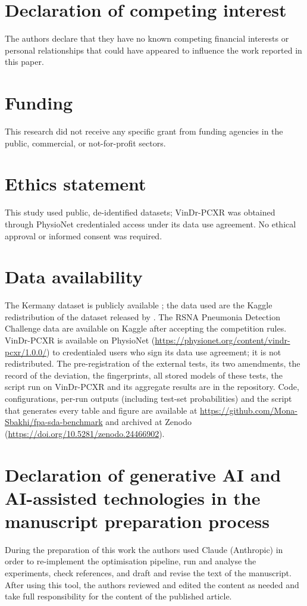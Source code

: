 \documentclass[preprint,12pt]{elsarticle}
\begin{document}
\section*{Declaration of competing interest}
The authors declare that they have no known competing financial interests or personal relationships that could have appeared to influence the work reported in this paper.

\section*{Funding}
This research did not receive any specific grant from funding agencies in the public, commercial, or not-for-profit sectors.

\section*{Ethics statement}
This study used public, de-identified datasets; VinDr-PCXR was obtained through PhysioNet credentialed access under its data use agreement. No ethical approval or informed consent was required.

\section*{Data availability}
The Kermany dataset is publicly available \citep{kaggle2018cxr,kermany2018}; the data used are the Kaggle redistribution of the dataset released by \citet{kermany2018}. The RSNA Pneumonia Detection Challenge data \citep{shih2019rsna} are available on Kaggle after accepting the competition rules. VinDr-PCXR \citep{pham2023pedicxr} is available on PhysioNet (\url{https://physionet.org/content/vindr-pcxr/1.0.0/}) to credentialed users who sign its data use agreement; it is not redistributed. The pre-registration of the external tests, its two amendments, the record of the deviation, the fingerprints, all stored models of these tests, the script run on VinDr-PCXR and its aggregate results are in the repository. Code, configurations, per-run outputs (including test-set probabilities) and the script that generates every table and figure are available at \url{https://github.com/Mona-Sbakhi/fpa-sda-benchmark} and archived at Zenodo (\url{https://doi.org/10.5281/zenodo.24466902}).

\section*{Declaration of generative AI and AI-assisted technologies in the manuscript preparation process}
During the preparation of this work the authors used Claude (Anthropic) in order to re-implement the optimisation pipeline, run and analyse the experiments, check references, and draft and revise the text of the manuscript. After using this tool, the authors reviewed and edited the content as needed and take full responsibility for the content of the published article.
\end{document}
